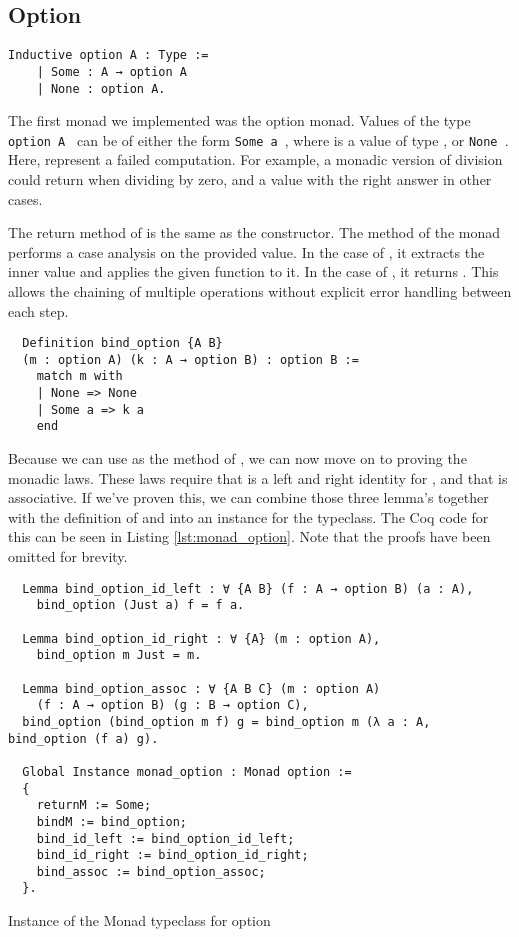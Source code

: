 \subsection{Option}
\begin{verbatim}
Inductive option A : Type :=
    | Some : A → option A
    | None : option A.
\end{verbatim}

The first monad we implemented was the option monad. Values of the type
\texttt{option A } can be of either the form 
\texttt{Some a }, where  is a value of type , or 
\texttt{None }. Here,  represent a failed
computation. For example, a monadic version of division  could return  when dividing by zero,
and a  value with the right answer in other cases.

The return method of  is the same as the  constructor. 
The  method of the  monad performs a case analysis on the provided
value. In the case of , it extracts the inner value and applies the given
function to it. In the case of , it returns . This allows the chaining
of multiple operations without explicit error handling between each step.

\begin{verbatim}
  Definition bind_option {A B} 
  (m : option A) (k : A → option B) : option B :=
    match m with
    | None => None
    | Some a => k a
    end
\end{verbatim}

Because we can use  as the  method of , we
can now move on to proving the monadic laws. These laws require that
 is a left and right identity for , and that 
 is associative. If we've proven this, we can combine those three lemma's
together with the definition of  and  into an
instance for the  typeclass. The Coq code for this can be seen in
Listing \ref{lst:monad_option}. Note that the proofs have been omitted for
brevity.

\begin{listing}
\begin{verbatim}
  Lemma bind_option_id_left : ∀ {A B} (f : A → option B) (a : A), 
    bind_option (Just a) f = f a.

  Lemma bind_option_id_right : ∀ {A} (m : option A), 
    bind_option m Just = m.

  Lemma bind_option_assoc : ∀ {A B C} (m : option A) 
    (f : A → option B) (g : B → option C),
  bind_option (bind_option m f) g = bind_option m (λ a : A, bind_option (f a) g).

  Global Instance monad_option : Monad option :=
  {
    returnM := Some;
    bindM := bind_option;
    bind_id_left := bind_option_id_left;
    bind_id_right := bind_option_id_right;
    bind_assoc := bind_option_assoc;
  }. 
\end{verbatim}
\caption{Instance of the Monad typeclass for option}
\label{lst:monad_option}
\end{listing}

